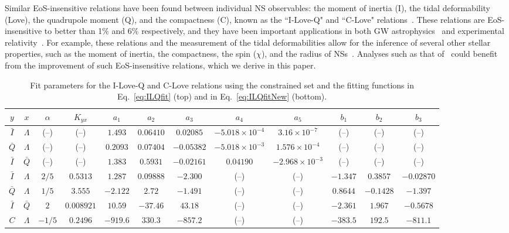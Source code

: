 \documentclass[prd,twocolumn,nofootinbib,superscriptaddress,amsmath,amssymb]{revtex4-1}
\begin{document}
Similar EoS-insensitive relations have been found between individual NS observables: the moment of inertia (I), the tidal deformability (Love), the quadrupole moment (Q), and the compactness (C), known as the ``I-Love-Q" and ``C-Love" relations~\cite{Yagi:ILQ, Yagi:binLove}.
These relations are EoS-insensitive to better than 1\% and 6\% respectively, and they have been important applications in both GW astrophysics~\cite{Kumar:2019xgp} and experimental relativity~\cite{Gupta:2017vsl}. For example, these relations and the measurement of the tidal deformabilities allow for the inference of several other stellar properties, such as the moment of inertia, the  compactness, the spin ($\chi$), and the radius of NSs~\cite{Kumar:2019xgp}.
Analyses such as that of~\cite{Kumar:2019xgp} could benefit from the improvement of such EoS-insensitive relations, which we derive in this paper. 


\begin{table*}[htb]
\centering
\begin{tabular}{ c  c  | c c c c c c c c c c} 
 \hline
 \hline
 $y$ & $x$ & $\alpha$ & $K_{yx}$ & $a_1$ & $a_2$ & $a_3$ & $a_{4}$ & $a_{5}$ & $b_1$ & $b_2$ & $b_3$ \\
 \hline
  $\bar{I}$ & $\Lambda$ & (--) & (--) & $1.493$ & $0.06410$ & $0.02085$ & $-5.018 \times 10^{-4}$ & $3.16 \times 10^{-7}$ & (--) & (--) & (--)  \\
 $\bar{Q}$ & $\Lambda$ & (--) & (--) & $0.2093$ & $0.07404$ & $-0.05382$ & $-5.018 \times 10^{-3}$ & $1.576 \times 10^{-4}$ & (--)  &(--)  & (--) \\ 
  $\bar{I}$ & $\bar{Q}$ & (--) & (--) & $1.383$ & $0.5931$ & $-0.02161$ & $0.04190$ & $-2.968 \times 10^{-3}$ &(--)  &(--) & (--) \\
 \hline 
 $\bar{I}$ & $\Lambda$ & $2/5$ & $0.5313$ & $1.287$ & $0.09888$ & $-2.300$ & (--) & (--) & $-1.347$ & $0.3857$ & $-0.02870$\\
 $\bar{Q}$ & $\Lambda$ & $1/5$ & $3.555$ & $-2.122$ & $2.72$ & $-1.491$ & (--) & (--) & $0.8644$ & $-0.1428$ & $-1.397$\\
 $\bar{I}$ & $\bar{Q}$ & $2$ & $0.008921$ & $10.59$ & $-37.46$ & $43.18$ &(--)  &(--)  & $-2.361$ & $1.967$ & $-0.5678$\\
 $C$ & $\Lambda$ & $-1/5$ & $0.2496$ & $-919.6$ & $330.3$ & $-857.2$ & (--) & (--) & $-383.5$ & $192.5$ & $-811.1$\\
\hline
\hline
\end{tabular}
\caption{
Fit parameters for the I-Love-Q and C-Love relations using the constrained set and the fitting functions in Eq.~\eqref{eq:ILQfit} (top) and in Eq.~\eqref{eq:ILQfitNew} (bottom).
}\label{tab:ILQfitNew}
\end{table*}
\end{document}
